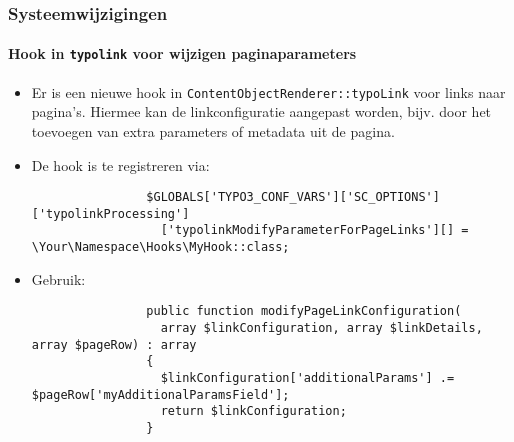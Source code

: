 \begin{frame}[fragile]
	\frametitle{Systeemwijzigingen}
	\framesubtitle{Hook in \texttt{typolink} voor wijzigen paginaparameters}

	\lstset{basicstyle=\tiny\ttfamily}

	\begin{itemize}
		\item Er is een nieuwe hook in \texttt{ContentObjectRenderer::typoLink} voor links naar pagina's.
			Hiermee kan de linkconfiguratie aangepast worden, bijv. door het toevoegen van extra parameters
			of metadata uit de pagina.

		\item De hook is te registreren via:

			\begin{lstlisting}
				$GLOBALS['TYPO3_CONF_VARS']['SC_OPTIONS']['typolinkProcessing']
				  ['typolinkModifyParameterForPageLinks'][] = \Your\Namespace\Hooks\MyHook::class;
			\end{lstlisting}

		\item Gebruik:

			\begin{lstlisting}
				public function modifyPageLinkConfiguration(
				  array $linkConfiguration, array $linkDetails, array $pageRow) : array
				{
				  $linkConfiguration['additionalParams'] .= $pageRow['myAdditionalParamsField'];
				  return $linkConfiguration;
				}
			\end{lstlisting}

	\end{itemize}

\end{frame}


